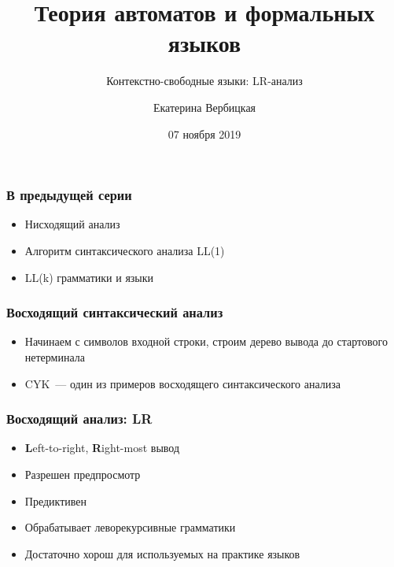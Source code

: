 \documentclass{beamer}
\title[]{Теория автоматов и формальных языков}
\subtitle[]{Контекстно-свободные языки: LR-анализ}
\institute[]{
Санкт-Петербургский государственный электротехнический университет <<ЛЭТИ>>\\
}
\author[]{Екатерина Вербицкая}
\date{07 ноября 2019}
\begin{document}
{
  \begin{frame}
    \titlepage
  \end{frame}
}


\begin{frame}[fragile]
  \transwipe[direction=90]
  \frametitle{В предыдущей серии}
  \begin{itemize}
    \item Нисходящий анализ
    \item Алгоритм синтаксического анализа LL(1)
    \item LL(k) грамматики и языки 
  \end{itemize}
\end{frame}

\begin{frame}[fragile]
  \transwipe[direction=90]
  \frametitle{Восходящий синтаксический анализ}
  \begin{itemize}
    \item Начинаем с символов входной строки, строим дерево вывода до стартового нетерминала 
    \item CYK~--- один из примеров восходящего синтаксического анализа
  \end{itemize}
  
\end{frame}

\begin{frame}[fragile]
  \transwipe[direction=90]
  \frametitle{Восходящий анализ: LR}
  \begin{itemize}
    \item \textbf{L}eft-to-right, \textbf{R}ight-most вывод
    \item Разрешен предпросмотр
    \item Предиктивен
    \item Обрабатывает леворекурсивные грамматики
    \item Достаточно хорош для используемых на практике языков
  \end{itemize}
\end{frame}
\end{document}
